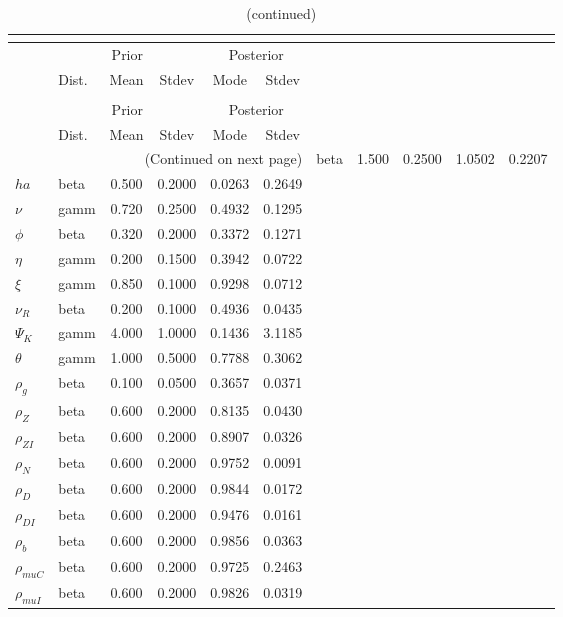  
\begin{center}
\begin{longtable}{llcccc} 
\caption{Results from posterior maximization (parameters)}\\
 \label{Table:Posterior:1}\\
\toprule 
  & \multicolumn{3}{c}{Prior}  &  \multicolumn{2}{c}{Posterior} \\
  \cmidrule(r{.75em}){2-4} \cmidrule(r{.75em}){5-6}
  & Dist. & Mean  & Stdev & Mode & Stdev \\ 
\midrule \endfirsthead 
\caption{(continued)}\\
 \bottomrule 
  & \multicolumn{3}{c}{Prior}  &  \multicolumn{2}{c}{Posterior} \\
  \cmidrule(r{.75em}){2-4} \cmidrule(r{.75em}){5-6}
  & Dist. & Mean  & Stdev & Mode & Stdev \\ 
\midrule \endhead 
\bottomrule \multicolumn{6}{r}{(Continued on next page)}\endfoot 
\bottomrule\endlastfoot 
${\sigma}$ & beta &   1.500 & 0.2500 &   1.0502 &  0.2207 \\ 
${ha}$ & beta &   0.500 & 0.2000 &   0.0263 &  0.2649 \\ 
$\nu$ & gamm &   0.720 & 0.2500 &   0.4932 &  0.1295 \\ 
${\phi}$ & beta &   0.320 & 0.2000 &   0.3372 &  0.1271 \\ 
${\eta}$ & gamm &   0.200 & 0.1500 &   0.3942 &  0.0722 \\ 
$\xi$ & gamm &   0.850 & 0.1000 &   0.9298 &  0.0712 \\ 
${\nu_R}$ & beta &   0.200 & 0.1000 &   0.4936 &  0.0435 \\ 
${\Psi_{K}}$ & gamm &   4.000 & 1.0000 &   0.1436 &  3.1185 \\ 
${\theta}$ & gamm &   1.000 & 0.5000 &   0.7788 &  0.3062 \\ 
${\rho_g}$ & beta &   0.100 & 0.0500 &   0.3657 &  0.0371 \\ 
${\rho_Z}$ & beta &   0.600 & 0.2000 &   0.8135 &  0.0430 \\ 
${\rho_{ZI}}$ & beta &   0.600 & 0.2000 &   0.8907 &  0.0326 \\ 
${\rho_N}$ & beta &   0.600 & 0.2000 &   0.9752 &  0.0091 \\ 
${\rho_D}$ & beta &   0.600 & 0.2000 &   0.9844 &  0.0172 \\ 
${\rho_{DI}}$ & beta &   0.600 & 0.2000 &   0.9476 &  0.0161 \\ 
${\rho_b}$ & beta &   0.600 & 0.2000 &   0.9856 &  0.0363 \\ 
${\rho_{muC}}$ & beta &   0.600 & 0.2000 &   0.9725 &  0.2463 \\ 
${\rho_{muI}}$ & beta &   0.600 & 0.2000 &   0.9826 &  0.0319 \\ 
\end{longtable}
 \end{center}
